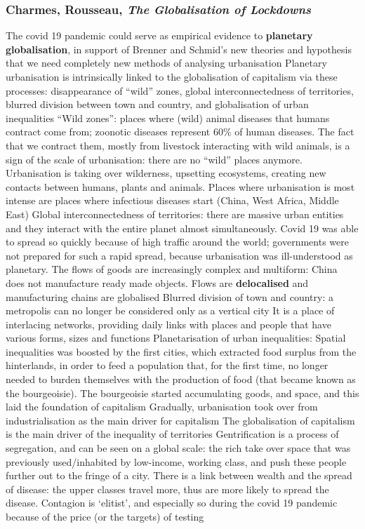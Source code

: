 \documentclass{article}
\begin{document}
\subsubsection{Charmes, Rousseau, \textit{The Globalisation of Lockdowns}}

\begin{outline}
	\1 The covid 19 pandemic could serve as empirical evidence to \textbf{planetary globalisation}, in support of Brenner and Schmid's new theories and hypothesis that we need completely new methods of analysing urbanisation
	\1 Planetary urbanisation is intrinsically linked to the globalisation of capitalism via these processes: disappearance of ``wild'' zones, global interconnectedness of territories, blurred division between town and country, and globalisation of urban inequalities
	\1 ``Wild zones'': places where (wild) animal diseases that humans contract come from; zoonotic diseases represent 60\% of human diseases. The fact that we contract them, mostly from livestock interacting with wild animals, is a sign of the scale of urbanisation: there are no ``wild'' places anymore. Urbanisation is taking over wilderness, upsetting ecosystems, creating new contacts between humans, plants and animals.
		\2 Places where urbanisation is most intense are places where infectious diseases start (China, West Africa, Middle East)
	\1 Global interconnectedness of territories: there are massive urban entities and they interact with the entire planet almost simultaneously. 
		\2 Covid 19 was able to spread so quickly because of high traffic around the world; governments were not prepared for such a rapid spread, because urbanisation was ill-understood as planetary. 
		\2 The flows of goods are increasingly complex and multiform: China does not manufacture ready made objects. Flows are \textbf{delocalised} and manufacturing chains are globalised
	\1 Blurred division of town and country: a metropolis can no longer be considered only as a vertical city
		\2 It is a place of interlacing networks, providing daily links with places and people that have various forms, sizes and functions
	\1 Planetarisation of urban inequalities:
		\2 Spatial inequalities was boosted by the first cities, which extracted food surplus from the hinterlands, in order to feed a population that, for the first time, no longer needed to burden themselves with the production of food (that became known as the bourgeoisie). The bourgeoisie started accumulating goods, and space, and this laid the foundation of capitalism
		\2 Gradually, urbanisation took over from industrialisation as the main driver for capitalism The globalisation of capitalism is the main driver of the inequality of territories
		\2  Gentrification is a process of segregation, and can be seen on a global scale: the rich take over space that was previously used/inhabited by low-income, working class, and push these people further out to the fringe of a city.
		\2 There is a link between wealth and the spread of disease: the upper classes travel more, thus are more likely to spread the disease. Contagion is `elitist', and especially so during the covid 19 pandemic because of the price (or the targets) of testing
\end{outline}
\end{document}
